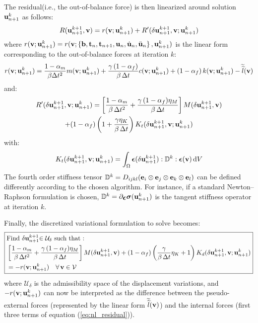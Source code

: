 The residual(i.e., the out-of-balance force) is then linearized around solution ${{\bf{u}}_{n+1}^{k}}$
as follows:
\begin{equation}
R({{\bf{u}}_{n+1}^{k+1}},{\bf{v}})=r({\bf{v}};{\bf{u}}_{n+1}^{k})+R'(\delta{{\bf{u}}_{n+1}^{k+1}},{\bf{v}};{\bf{u}}_{n+1}^{k})\label{eq:linearization_1-1}
\end{equation}
where $r({\bf{v}};{\bf{u}}_{n+1}^{k})=r({\bf{v}};\left\{ {\bf{b}},{\bf t}_{n},{\bf t}_{n+1},{\bf{u}}_{n},\dot{{\bf{u}}}_{n},\ddot{{\bf{u}}}_{n}\right\} ,{\bf{u}}_{n+1}^{k})$
is the linear form corresponding to the out-of-balance forces at iteration
$k$:
\begin{equation}
r({\bf{v}};{\bf{u}}_{n+1}^{k})=\frac{1-\alpha_{m}}{\beta\Delta t^{2}}m({\bf{v}};{\bf{u}}_{n+1}^{k})+\frac{\gamma\,(1-\alpha_{f})}{\beta\,\Delta t}c({\bf{v}};{\bf{u}}_{n+1}^{k})+\left(1-\alpha_{f}\right)k({\bf{v}};{\bf{u}}_{n+1}^{k})-\widetilde{\widetilde{l}}({\bf{v}})\label{eq:nl_residual}
\end{equation}
and:
\begin{multline}
R'(\delta{{\bf{u}}_{n+1}^{k+1}},{\bf{v}};{\bf{u}}_{n+1}^{k})= \left[ \frac{1-\alpha_{m}}{\beta\,\Delta t^{2}}+ \frac{\gamma\,(1-\alpha_{f})\eta_M}{\beta\,\Delta t}  \right] M(\delta{{\bf{u}}_{n+1}^{k+1}},{\bf{v}}) \\ + (1-\alpha_{f})\left(1+\frac{\gamma\eta_{K}}{\beta\,\Delta t}\right)K_{t}(\delta{{\bf{u}}_{n+1}^{k+1}},{\bf{v}};{\bf{u}}_{n+1}^{k})\label{eq:linearization_1}
\end{multline}
with:
\begin{equation}
K_{t}(\delta{{\bf{u}}_{n+1}^{k+1}},{\bf{v}};{\bf{u}}_{n+1}^{k})=\int_{\Omega}\mbox{\boldmath${\epsilon}$}(\delta{{\bf{u}}_{n+1}^{k+1}}):\mathbb{D}^{k}:\mbox{\boldmath${\epsilon}$}({\bf{v}})\,{\rm d}V
\end{equation}
The fourth order stiffness tensor $\mathbb{D}^{k}=D_{ijkl}({\bf{e}}_{i}\otimes{\bf{e}}_{j}\otimes{\bf{e}}_{k}\otimes{\bf{e}}_{l})$
can be defined differently according to the chosen algorithm. For
instance, if a standard Newton--Raphson formulation is chosen, $\mathbb{D}^{k}=\partial_{\mbox{\boldmath${\epsilon}$}}\mbox{\boldmath${\sigma}$}({{\bf{u}}_{n+1}^{k}})$
is the tangent stiffness operator at iteration $k$.

Finally, the discretized variational formulation to solve becomes:
\begin{equation}
\boxed{\begin{aligned} & \text{Find \ensuremath{\delta{{\bf{u}}_{n+1}^{k+1}}}\ensuremath{\in\mathcal{U}_{\delta}} such that : }\\
 & \left[ \frac{1-\alpha_{m}}{\beta\,\Delta t^{2}}+ \frac{\gamma\,(1-\alpha_{f})\eta_M}{\beta\,\Delta t}  \right] M(\delta{{\bf{u}}_{n+1}^{k+1}},{\bf{v}}) + (1-\alpha_{f})\left(\frac{\gamma}{\beta\,\Delta t}\eta_{K}+1\right)K_{d}(\delta{{\bf{u}}_{n+1}^{k+1}},{\bf{v}};{\bf{u}}_{n+1}^{k}) \\ & =-r({\bf{v}};{\bf{u}}_{n+1}^{k})\quad\text{\ensuremath{\forall\,}}{\bf{v}}\in\mathcal{V}
\end{aligned}
}
\end{equation}
where $\mathcal{U}_{\delta}$ is the admissibility space of the displacement
variations, and $-r({\bf{v}};{\bf{u}}_{n+1}^{k})$ can now be interpreted as
the difference between the pseudo-external forces (represented by the linear form $\widetilde{\widetilde{l}}({\bf{v}})$)
and the internal forces (first three terms of equation (\ref{eq:nl_residual})).

